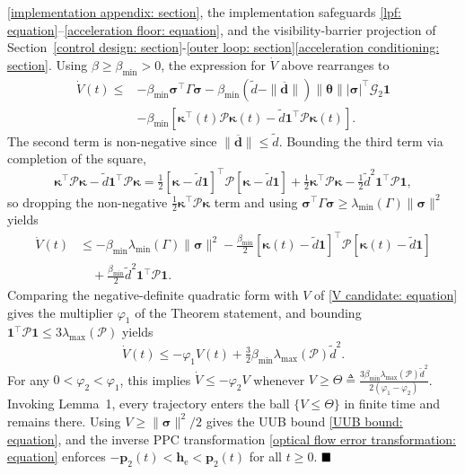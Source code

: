 \documentclass{IEEEtaes}
\begin{document}
\ref{implementation appendix: section}, the implementation safeguards \eqref{lpf: equation}--\eqref{acceleration floor: equation}, and the visibility-barrier projection of Section~\ref{control design: section}-\ref{outer loop: section}\ref{acceleration conditioning: section}. Using $\beta\ge\beta_{\min}>0$, the expression for $\dot{V}$ above rearranges to
\begin{align*}
\dot{V}(t)\le& -\beta_{\min}\boldsymbol{\sigma}^\top\Gamma\boldsymbol{\sigma} - \beta_{\min}(\tilde{d}-\|\boldsymbol{\overline{d}}\|)\|\boldsymbol{\theta}\||\boldsymbol{\sigma}|^\top\mathcal{G}_2\boldsymbol{1}\\
&- \beta_{\min}[\boldsymbol{\kappa}^\top(t)\mathcal{P}\boldsymbol{\kappa}(t) - \tilde{d}\boldsymbol{1}^\top\mathcal{P}\boldsymbol{\kappa}(t)].
\end{align*}
The second term is non-negative since $\|\boldsymbol{\overline{d}}\|\le\tilde{d}$. Bounding the third term via completion of the square,
\begin{equation*}
    \boldsymbol{\kappa}^\top\mathcal{P}\boldsymbol{\kappa} - \tilde{d}\boldsymbol{1}^\top\mathcal{P}\boldsymbol{\kappa} = \tfrac12[\boldsymbol{\kappa}-\tilde{d}\boldsymbol{1}]^\top\mathcal{P}[\boldsymbol{\kappa}-\tilde{d}\boldsymbol{1}] + \tfrac12\boldsymbol{\kappa}^\top\mathcal{P}\boldsymbol{\kappa} - \tfrac12\tilde{d}^2\boldsymbol{1}^\top\mathcal{P}\boldsymbol{1},
\end{equation*}
so dropping the non-negative $\tfrac12\boldsymbol{\kappa}^\top\mathcal{P}\boldsymbol{\kappa}$ term and using $\boldsymbol{\sigma}^\top\Gamma\boldsymbol{\sigma}\ge\lambda_{\min}(\Gamma)\|\boldsymbol{\sigma}\|^2$ yields
\begin{align*}
\dot{V}(t)&\le -\beta_{\min}\lambda_{\min}(\Gamma)\|\boldsymbol{\sigma}\|^2 - \tfrac{\beta_{\min}}{2}[\boldsymbol{\kappa}(t)-\tilde{d}\boldsymbol{1}]^\top\mathcal{P}[\boldsymbol{\kappa}(t)-\tilde{d}\boldsymbol{1}]\\
&\quad + \tfrac{\beta_{\min}}{2}\tilde{d}^2\boldsymbol{1}^\top\mathcal{P}\boldsymbol{1}.
\end{align*}
Comparing the negative-definite quadratic form with $V$ of \eqref{V candidate: equation} gives the multiplier $\varphi_1$ of the Theorem statement, and bounding $\boldsymbol{1}^\top\mathcal{P}\boldsymbol{1}\le 3\lambda_{\max}(\mathcal{P})$ yields
\begin{equation} \label{Vdot bound: equation}
    \dot{V}(t)\le -\varphi_1 V(t) + \tfrac32\beta_{\min}\lambda_{\max}(\mathcal{P})\tilde{d}^2.
\end{equation}
For any $0<\varphi_2<\varphi_1$, this implies $\dot{V}\le-\varphi_2 V$ whenever $V\ge\Theta\triangleq \tfrac{3\beta_{\min}\lambda_{\max}(\mathcal{P})\tilde{d}^2}{2(\varphi_1-\varphi_2)}$. Invoking Lemma~1, every trajectory enters the ball $\{V\le\Theta\}$ in finite time and remains there. Using $V\ge\|\boldsymbol{\sigma}\|^2/2$ gives the UUB bound \eqref{UUB bound: equation}, and the inverse PPC transformation \eqref{optical flow error transformation: equation} enforces $-\boldsymbol{p}_2(t)<\boldsymbol{h}_\text{e}<\boldsymbol{p}_2(t)$ for all $t\ge 0$. $\hfill\blacksquare$
\end{document}

